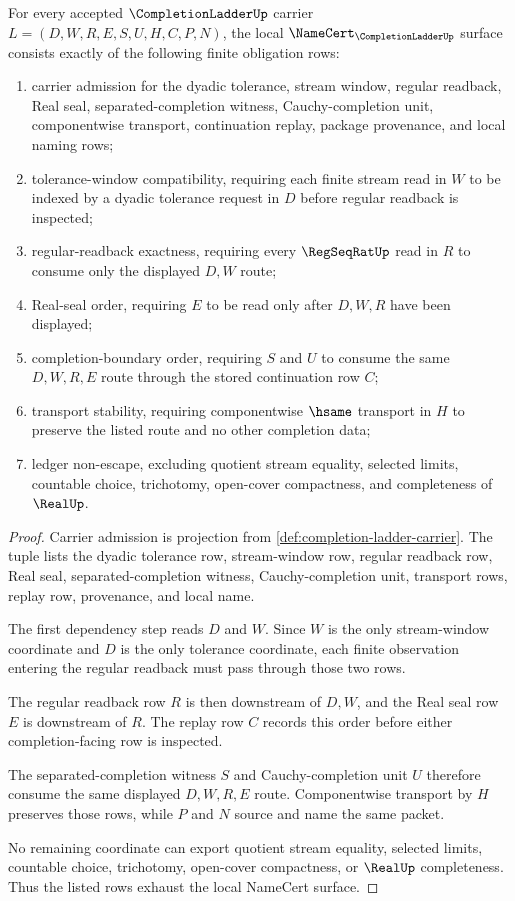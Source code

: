 \begin{theorem}
\label{thm:completion-ladder-namecert-obligations}
For every accepted $\CompletionLadderUp$ carrier $L=(D,W,R,E,S,U,H,C,P,N)$, the local $\NameCert_{\CompletionLadderUp}$ surface consists exactly of the following finite obligation rows:
\begin{enumerate}
\item carrier admission for the dyadic tolerance, stream window, regular readback, Real seal, separated-completion witness, Cauchy-completion unit, componentwise transport, continuation replay, package provenance, and local naming rows;
\item tolerance-window compatibility, requiring each finite stream read in $W$ to be indexed by a dyadic tolerance request in $D$ before regular readback is inspected;
\item regular-readback exactness, requiring every $\RegSeqRatUp$ read in $R$ to consume only the displayed $D,W$ route;
\item Real-seal order, requiring $E$ to be read only after $D,W,R$ have been displayed;
\item completion-boundary order, requiring $S$ and $U$ to consume the same $D,W,R,E$ route through the stored continuation row $C$;
\item transport stability, requiring componentwise $\hsame$ transport in $H$ to preserve the listed route and no other completion data;
\item ledger non-escape, excluding quotient stream equality, selected limits, countable choice, trichotomy, open-cover compactness, and completeness of $\RealUp$.
\end{enumerate}
\end{theorem}
\begin{proof}
Carrier admission is projection from \autoref{def:completion-ladder-carrier}. The tuple lists the dyadic tolerance row, stream-window row, regular readback row, Real seal, separated-completion witness, Cauchy-completion unit, transport rows, replay row, provenance, and local name.

The first dependency step reads $D$ and $W$. Since $W$ is the only stream-window coordinate and $D$ is the only tolerance coordinate, each finite observation entering the regular readback must pass through those two rows.

The regular readback row $R$ is then downstream of $D,W$, and the Real seal row $E$ is downstream of $R$. The replay row $C$ records this order before either completion-facing row is inspected.

The separated-completion witness $S$ and Cauchy-completion unit $U$ therefore consume the same displayed $D,W,R,E$ route. Componentwise transport by $H$ preserves those rows, while $P$ and $N$ source and name the same packet.

No remaining coordinate can export quotient stream equality, selected limits, countable choice, trichotomy, open-cover compactness, or $\RealUp$ completeness. Thus the listed rows exhaust the local NameCert surface.
\end{proof}

